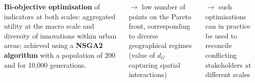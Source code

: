 \documentclass[a0paper]{tikzposter}
\begin{document}
\begin{columns}
{{			    \textbf{Bi-objective optimisation} of indicators at both scales: aggregated utility at the macro scale and diversity of innovations within urban areas; achieved using a \textbf{NSGA2 algorithm} with a population of 200 and for 10,000 generations.

			   
			    \vspace{0.5cm}
			  
			    
			    $\rightarrow$ low number of points on the Pareto front, corresponding to diverse geographical regimes (value of $d_G$ capturing spatial interactions)
			    
			     \vspace{0.5cm}
			    
			     $\rightarrow$ such optimisations can in practice be used to reconcile conflicting stakeholders at different scales
			     
		      }
		
		}
		
		
	\end{columns}	
\end{document}

